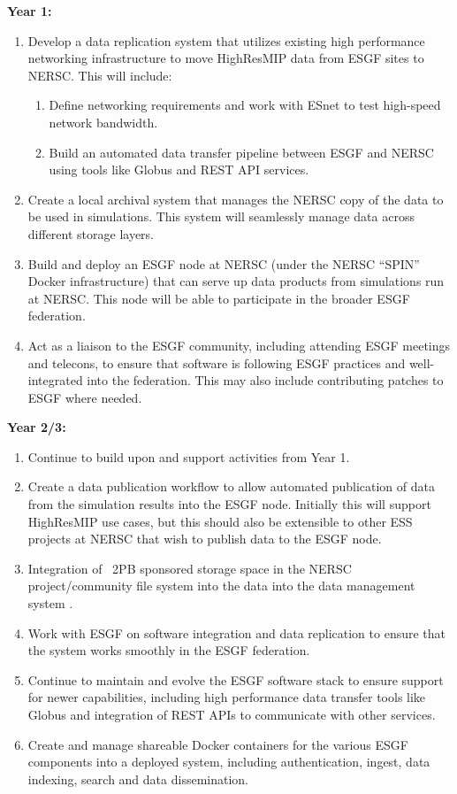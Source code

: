 \documentclass[11pt]{article}
\begin{document}
\noindent \textbf{Year 1:}
\begin{enumerate}
\item Develop a data replication system that utilizes existing high performance networking infrastructure to move HighResMIP data from ESGF sites to NERSC. This will include: 
\begin{enumerate}
\item Define networking requirements and work with ESnet to test high-speed network bandwidth. 
\item Build an automated data transfer pipeline between ESGF and NERSC using tools like Globus and REST API services. 
\end{enumerate}
\item Create a local archival system that manages the NERSC copy of the data to be used in simulations. This system will seamlessly manage data across different storage layers. 
\item Build and deploy an ESGF node at NERSC (under the NERSC “SPIN” Docker infrastructure) that can serve up data products from simulations run at NERSC. This node will be able to participate in the broader ESGF federation.
\item Act as a liaison to the ESGF community, including attending ESGF meetings and telecons, to ensure that software is following ESGF practices and well-integrated into the federation. This may also include contributing patches to ESGF where needed.
\end{enumerate}
\noindent \textbf{Year 2/3:}
\begin{enumerate}
\item Continue to build upon and support activities from Year 1.
\item Create a data publication workflow to allow automated publication of data from the simulation results into the ESGF node. Initially this will support HighResMIP use cases, but this should also be extensible to other ESS projects at NERSC that wish to publish data to the ESGF node.
\item Integration of ~2PB sponsored storage space in the NERSC project/community file system into the data into the data management system . 
\item Work with ESGF on software integration and data replication to ensure that the system works smoothly in the ESGF federation.
\item Continue to maintain and evolve the ESGF software stack to ensure support for newer capabilities, including high performance data transfer tools like Globus and integration of REST APIs to communicate with other services. 
\item Create and manage shareable Docker containers for the various ESGF components into a deployed system, including authentication, ingest, data indexing, search and data dissemination.
\end{enumerate}
\end{document}

